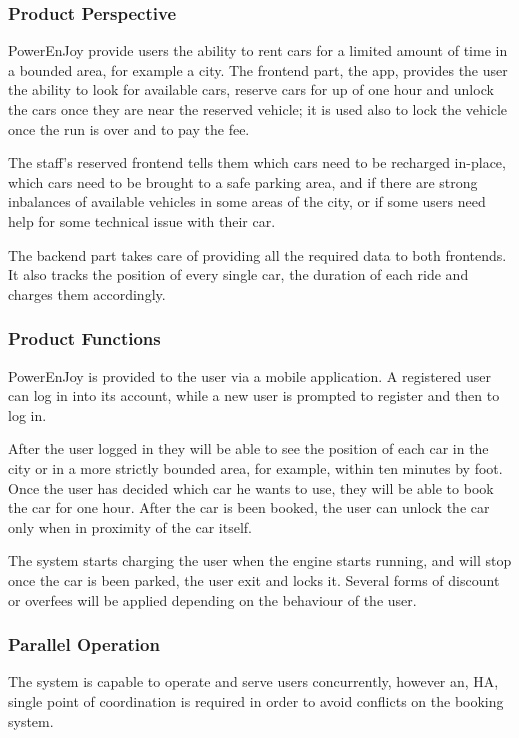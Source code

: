 \documentclass[11pt]{article} %
\newcommand{\pe}{PowerEnJoy }
\begin{document}
\subsubsection{Product Perspective}
  
  \pe provide users the ability to rent cars for a limited amount of time in a bounded area, for example a city. 
  The frontend part, the app, provides the user the ability to look for available cars, reserve cars for up of one hour and unlock the cars once they are near the reserved vehicle; it is used also to lock the vehicle once the run is over and to pay the fee.

The staff's reserved frontend tells them which cars need to be recharged in-place, which cars need to be brought to a safe parking area, and if there are strong inbalances of available vehicles in some areas of the city, or if some users need help for some technical issue with their car.

  The backend part takes care of providing all the required data to both frontends. It also tracks the position of every single car, the duration of each ride and charges them accordingly.
  
  \subsubsection{Product Functions}
  
  \pe is provided to the user via a mobile application. A registered user can log in into its account, while a new user is prompted to register and then to log in.
  
  After the user logged in they will be able to see the position of each car in the city or in a more strictly bounded area, for example, within ten minutes by foot. Once the user has decided which car he wants to use, they will be able to book the car for one hour. After the car is been booked, the user can unlock the car only when in proximity of the car itself.
  
  The system starts charging the user when the engine starts running, and will stop once the car is been parked, the user exit and locks it. Several forms of discount or overfees will be applied depending on the behaviour of the user.


  \subsubsection{Parallel Operation}
  The system is capable to operate and serve users concurrently, however an, HA, single point of coordination is required in order to avoid conflicts on the booking system.
  
\end{document}
